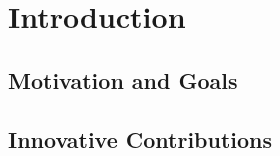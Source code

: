 \section{Introduction}
\label{section-introduction}


\subsection{Motivation and Goals}

\subsection{Innovative Contributions}